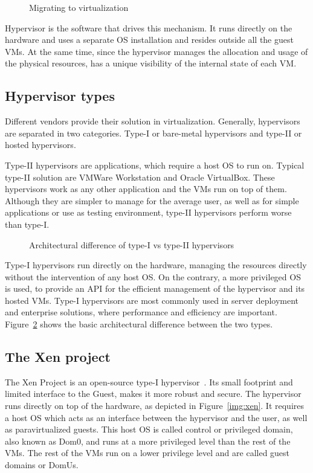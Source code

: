 \begin{figure}
	\centering
	
	\caption{Migrating to virtualization}
	\label{fig:tovirt}
\end{figure}

Hypervisor is the software that drives this mechanism. It runs directly on the hardware and uses a separate \ac{OS} installation and resides outside all the guest \ac{VM}s. At the same time, since the hypervisor manages the allocation and usage of the physical resources, has a unique visibility of the internal state of each \ac{VM}. 
\subsection{Hypervisor types}\label{sub:hyptypes}
Different vendors provide their solution in virtualization. Generally, hypervisors are separated in two categories. Type-I or bare-metal hypervisors and type-II or hosted hypervisors.
\par Type-II hypervisors are applications, which require a host \ac{OS} to run on. Typical type-II solution are VMWare Workstation and Oracle VirtualBox. These hypervisors work as any other application and the \ac{VM}s run on top of them. Although they are simpler to manage for the average user, as well as for simple applications or use as testing environment, type-II hypervisors perform worse than type-I. 

\begin{figure}
	\centering
	
	\caption{Architectural difference of type-I vs type-II hypervisors}
	\label{fig:hyptypes}
\end{figure}

\par Type-I hypervisors run directly on the hardware, managing the resources directly without the intervention of any host \ac{OS}. On the contrary, a more privileged \ac{OS} is used, to provide an \ac{API} for the efficient management of the hypervisor and its hosted \ac{VM}s. Type-I hypervisors are most commonly used in server deployment and enterprise solutions, where performance and efficiency are important. Figure~\ref{fig:hyptypes} shows the basic architectural difference between the two types.

\subsection{The Xen project}\label{sub:xen}
The Xen Project is an open-source type-I hypervisor~\cite{xen}. Its small footprint and limited interface to the Guest, makes it more robust and secure. The hypervisor runs directly on top of the hardware, as depicted in Figure~\ref{img:xen}. It requires a host \ac{OS} which acts as an interface between the hypervisor and the user, as well as paravirtualized guests. This host \ac{OS} is called control or privileged domain, also known as Dom0, and runs at a more privileged level than the rest of the \ac{VM}s. The rest of the \ac{VM}s run on a lower privilege level and are called guest domains or DomUs. 

